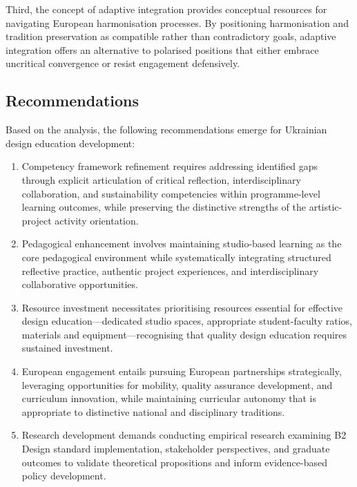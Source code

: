 \documentclass[ed]{acnsart}
\begin{document}
	Third, the concept of adaptive integration provides conceptual resources for navigating European harmonisation processes. By positioning harmonisation and tradition preservation as compatible rather than contradictory goals, adaptive integration offers an alternative to polarised positions that either embrace uncritical convergence or resist engagement defensively.
	
	\subsection{Recommendations}
	
	Based on the analysis, the following recommendations emerge for Ukrainian design education development:
	
	\begin{enumerate}
		\item Competency framework refinement requires addressing identified gaps through explicit articulation of critical reflection, interdisciplinary collaboration, and sustainability competencies within programme-level learning outcomes, while preserving the distinctive strengths of the artistic-project activity orientation.
		
		\item Pedagogical enhancement involves maintaining studio-based learning as the core pedagogical environment while systematically integrating structured reflective practice, authentic project experiences, and interdisciplinary collaborative opportunities.
		
		\item Resource investment necessitates prioritising resources essential for effective design education—dedicated studio spaces, appropriate student-faculty ratios, materials and equipment—recognising that quality design education requires sustained investment.
		
		\item European engagement entails pursuing European partnerships strategically, leveraging opportunities for mobility, quality assurance development, and curriculum innovation, while maintaining curricular autonomy that is appropriate to distinctive national and disciplinary traditions.
		
		\item Research development demands conducting empirical research examining B2 Design standard implementation, stakeholder perspectives, and graduate outcomes to validate theoretical propositions and inform evidence-based policy development.
	\end{enumerate}
	
\end{document}
